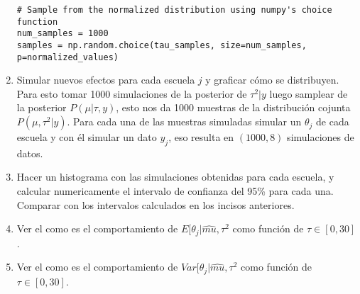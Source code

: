\documentclass[12pt]{paper}
\begin{document}
\begin{enumerate}
\begin{verbatim}
# Sample from the normalized distribution using numpy's choice function
num_samples = 1000
samples = np.random.choice(tau_samples, size=num_samples, p=normalized_values)
\end{verbatim}
\item Simular nuevos efectos para cada escuela $j$ y graficar cómo se distribuyen. Para esto tomar 1000 simulaciones de la posterior de $\tau^{2}|y$ luego samplear de la posterior $P(\mu|\tau,y)$, esto nos da 1000 muestras de la distribución cojunta $P(\mu,\tau^{2}|y)$. Para cada una de las muestras simuladas simular un $\theta_{j}$ de cada escuela y con él simular un dato $y_{j}$, eso resulta en $(1000,8)$ simulaciones de datos. 
\item Hacer un histograma con las simulaciones obtenidas para cada escuela, y calcular numericamente el intervalo de confianza del 95\% para cada una. Comparar con los intervalos calculados en los incisos anteriores.
\item Ver el como es el comportamiento de $E[\theta_{j}|\hat{mu},\tau^{2}$ como función de $\tau \in [0,30]$.
\item Ver el como es el comportamiento de $Var[\theta_{j}|\hat{mu},\tau^{2}$ como función de $\tau \in [0,30]$.
\end{enumerate}

\pagestyle{empty}
\end{document}
